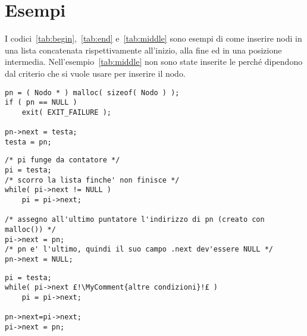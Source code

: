 	\section{Esempi}
I codici~\ref{tab:begin},~\ref{tab:end} e~\ref{tab:middle} sono esempi di come inserire nodi in una lista concatenata rispettivamente all'inizio, alla fine ed in una posizione intermedia.
Nell'esempio~\ref{tab:middle} non sono state inserite le  perché dipendono dal criterio che si vuole usare per inserire il nodo.
	
\begin{lstlisting}[caption={\emph{Inserimento in testa}}, label={tab:begin}]
pn = ( Nodo * ) malloc( sizeof( Nodo ) );
if ( pn == NULL )
	exit( EXIT_FAILURE );

pn->next = testa;
testa = pn;
\end{lstlisting}

\begin{lstlisting}[caption={\emph{Inserimento in coda}}, label={tab:end}]
/* pi funge da contatore */
pi = testa;
/* scorro la lista finche' non finisce */
while( pi->next != NULL )
	pi = pi->next;

/* assegno all'ultimo puntatore l'indirizzo di pn (creato con malloc()) */
pi->next = pn;
/* pn e' l'ultimo, quindi il suo campo .next dev'essere NULL */
pn->next = NULL;
\end{lstlisting}

\begin{lstlisting}[caption={\emph{Inserimento intermedio}}, label={tab:middle}]
pi = testa;
while( pi->next £!\MyComment{altre condizioni}!£ )
	pi = pi->next;

pn->next=pi->next;
pi->next = pn;
\end{lstlisting}
	

